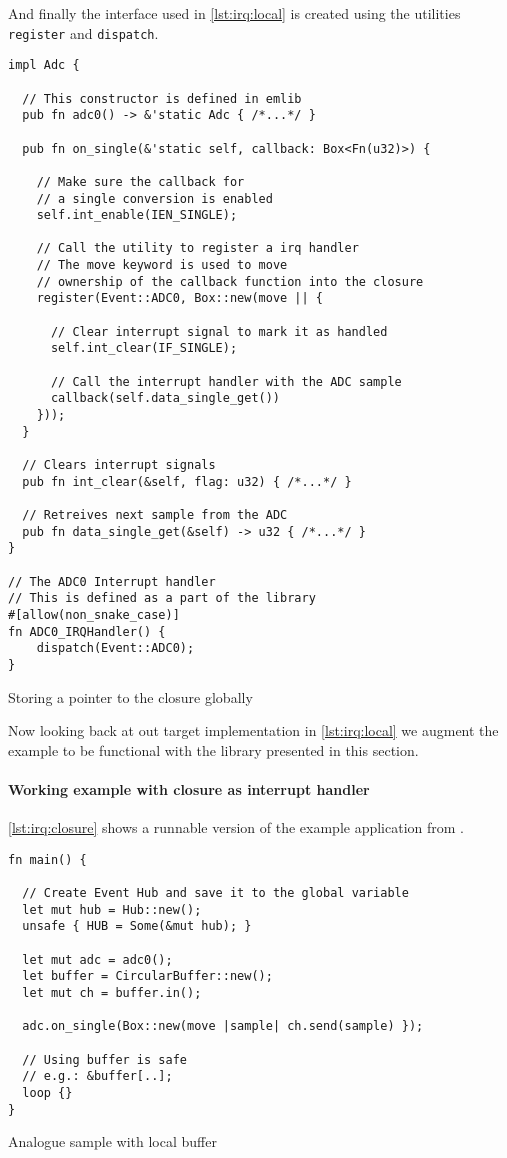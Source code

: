 And finally the interface used in \autoref{lst:irq:local} is created using the utilities \texttt{register} and \texttt{dispatch}.
\begin{listing}[H]
  \begin{verbatim}
impl Adc {

  // This constructor is defined in emlib
  pub fn adc0() -> &'static Adc { /*...*/ }

  pub fn on_single(&'static self, callback: Box<Fn(u32)>) {

    // Make sure the callback for
    // a single conversion is enabled
    self.int_enable(IEN_SINGLE);

    // Call the utility to register a irq handler
    // The move keyword is used to move
    // ownership of the callback function into the closure
    register(Event::ADC0, Box::new(move || {

      // Clear interrupt signal to mark it as handled
      self.int_clear(IF_SINGLE);

      // Call the interrupt handler with the ADC sample
      callback(self.data_single_get())
    }));
  }

  // Clears interrupt signals
  pub fn int_clear(&self, flag: u32) { /*...*/ }

  // Retreives next sample from the ADC
  pub fn data_single_get(&self) -> u32 { /*...*/ }
}

// The ADC0 Interrupt handler
// This is defined as a part of the library
#[allow(non_snake_case)]
fn ADC0_IRQHandler() {
    dispatch(Event::ADC0);
}
  \end{verbatim}
  \caption{Storing a pointer to the closure globally}
  \label{lst:raw-global-pointer-to-closure}
\end{listing}

Now looking back at out target implementation in \autoref{lst:irq:local} we augment the example to be functional with the library presented in this section.

\paragraph{Working example with closure as interrupt handler}

\autoref{lst:irq:closure} shows a runnable version of the example application from \label{par:irq:motivation}.

\begin{listing}[H]
  \begin{verbatim}
fn main() {

  // Create Event Hub and save it to the global variable
  let mut hub = Hub::new();
  unsafe { HUB = Some(&mut hub); }

  let mut adc = adc0();
  let buffer = CircularBuffer::new();
  let mut ch = buffer.in();

  adc.on_single(Box::new(move |sample| ch.send(sample) });

  // Using buffer is safe
  // e.g.: &buffer[..];
  loop {}
}
  \end{verbatim}
  \caption{Analogue sample with local buffer}
  \label{lst:irq:closure}
\end{listing}


